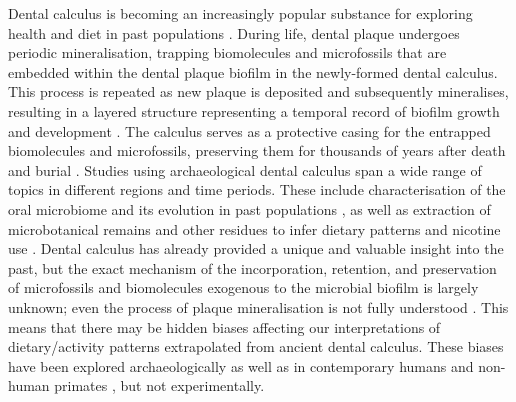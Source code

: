 \documentclass[10pt,a4paper]{article}
\begin{document}
Dental calculus is becoming an increasingly popular substance for
exploring health and diet in past populations
\cite{warinnerNewEra2015}. During life, dental plaque undergoes
periodic mineralisation, trapping biomolecules and microfossils that are
embedded within the dental plaque biofilm in the newly-formed dental
calculus. This process is repeated as new plaque is deposited and
subsequently mineralises, resulting in a layered structure representing
a temporal record of biofilm growth and development
\cite{warinnerPathogensHost2014}. The calculus serves as a protective
casing for the entrapped biomolecules and microfossils, preserving them
for thousands of years after death and burial
\cite{yatesOralMicrobiome2021}. Studies using archaeological dental
calculus span a wide range of topics in different regions and time
periods. These include characterisation of the oral microbiome and its
evolution in past populations
\cite{velskoMicrobialDifferences2019, adlerSequencingAncient2013, warinnerPathogensHost2014, kazarinaPostmedievalMicrobial2021, yatesOralMicrobiome2021},
as well as extraction of microbotanical remains
\cite{henryCalculusSyria2008, hardyStarchGranules2009, mickleburghNewInsights2012, maHumanDiet2022}
and other residues to infer dietary patterns and nicotine use
\cite{buckleyDentalCalculus2014, hendyProteomicCalculus2018, eerkensDentalCalculus2018, bartholdyMultiproxyAnalysis2023, velskoDentalCalculus2017}.
Dental calculus has already provided a unique and valuable insight into
the past, but the exact mechanism of the incorporation, retention, and
preservation of microfossils and biomolecules exogenous to the microbial
biofilm is largely unknown; even the process of plaque mineralisation is
not fully understood
\cite{omelonReviewPhosphate2013, jinSupragingivalCalculus2002}. This
means that there may be hidden biases affecting our interpretations of
dietary/activity patterns extrapolated from ancient dental calculus.
These biases have been explored archaeologically
\cite{fagernasMicrobialBiogeography2022, trompEDTACalculus2017} as well
as in contemporary humans \cite{leonardPlantMicroremains2015} and
non-human primates \cite{powerChimpCalculus2015}, but not
experimentally.
\end{document}
